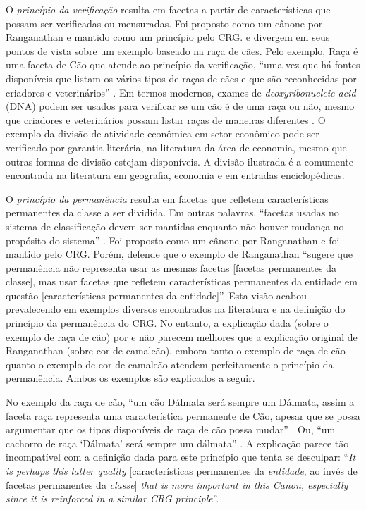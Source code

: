 O \emph{princípio da verificação} resulta em facetas a partir de características que possam ser verificadas ou mensuradas. Foi proposto como um cânone por Ranganathan e mantido como um princípio pelo CRG.  e  divergem em seus pontos de vista sobre um exemplo baseado na raça de cães. Pelo exemplo, Raça é uma faceta de Cão que atende ao princípio da verificação, ``uma vez que há fontes disponíveis que listam os vários tipos de raças de cães e que são reconhecidas por criadores e veterinários'' \cite[Sec. 5]{spiteri98simplified}. Em termos modernos, exames de \textit{deoxyribonucleic acid} (DNA) podem ser usados para verificar se um cão é de uma raça ou não, mesmo que criadores e veterinários possam listar raças de maneiras diferentes \cite[p. 67]{lima04spiteri}. O exemplo da divisão de atividade econômica em setor econômico pode ser verificado por garantia literária, na literatura da área de economia, mesmo que outras formas de divisão estejam disponíveis. A divisão ilustrada é a comumente encontrada na literatura em geografia, economia e em entradas enciclopédicas.

O \emph{princípio da permanência} resulta em facetas que refletem características permanentes da classe a ser dividida. Em outras palavras, ``facetas usadas no sistema de classificação devem ser mantidas enquanto não houver mudança no propósito do sistema'' \cite[Sec. 3, tradução nossa]{spiteri98simplified}. Foi proposto como um cânone por Ranganathan e foi mantido pelo CRG. Porém,  defende que o exemplo de Ranganathan ``sugere que permanência não representa usar as mesmas facetas [facetas permanentes da classe], mas usar facetas que refletem características permanentes da entidade em questão [características permanentes da entidade]''. Esta visão acabou prevalecendo em exemplos diversos encontrados na literatura e na definição do princípio da permanência do CRG. No entanto, a explicação dada (sobre o exemplo de raça de cão) por  e  não parecem melhores que a explicação original de Ranganathan (sobre cor de camaleão), embora tanto o exemplo de raça de cão quanto o exemplo de cor de camaleão atendem perfeitamente o princípio da permanência. Ambos os exemplos são explicados a seguir.

No exemplo da raça de cão, ``um cão Dálmata será sempre um Dálmata, assim a faceta raça representa uma característica permanente de Cão, apesar que se possa argumentar que os tipos disponíveis de raça de cão possa mudar'' \cite[Sec. 3, tradução nossa]{spiteri98simplified}. Ou, ``um cachorro de raça `Dálmata' será sempre um dálmata'' \cite[p. 67]{lima04spiteri}. A explicação parece tão incompatível com a definição dada para este princípio que  tenta se desculpar: ``\textit{It is perhaps this latter quality} [características permanentes da \textit{entidade}, ao invés de facetas permanentes da \textit{classe}] \textit{that is more important in this Canon, especially since it is reinforced in a similar CRG principle}''. 

